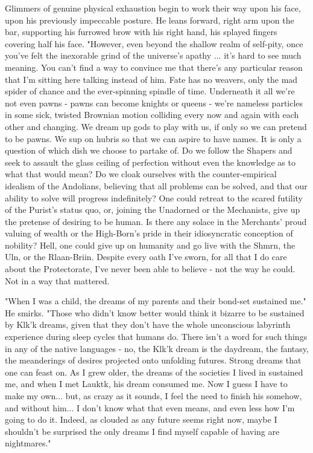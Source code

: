 Glimmers of genuine physical exhaustion begin to work their way upon
his face, upon his previously impeccable posture. He leans forward,
right arm upon the bar, supporting his furrowed brow with his right
hand, his splayed fingers covering half his face. "However, even
beyond the shallow realm of self-pity, once you've felt the inexorable
grind of the universe's apathy ... it's hard to see much meaning.  You
can't find a way to convince me that there's any particular reason
that I'm sitting here talking instead of him. Fate has no weavers,
only the mad spider of chance and the ever-spinning spindle of time.
Underneath it all we're not even pawns - pawns can become knights or
queens - we're nameless particles in some sick, twisted Brownian
motion colliding every now and again with each other and changing.  We
dream up gods to play with us, if only so we can pretend to be
pawns. We sup on hubris so that we can aspire to have names.  It is
only a question of which dish we choose to partake of. Do we follow
the Shapers and seek to assault the glass ceiling of perfection
without even the knowledge as to what that would mean?  Do we cloak
ourselves with the counter-empirical idealism of the Andolians,
believing that all problems can be solved, and that our ability to
solve will progress indefinitely?  One could retreat to the scared
futility of the Purist's status quo, or, joining the Unadorned or the
Mechanists, give up the pretense of desiring to be human.  Is there
any solace in the Merchants' proud valuing of wealth or the
High-Born's pride in their idiosyncratic conception of nobility? Hell,
one could give up on humanity and go live with the Shmrn, the Uln, or
the Rlaan-Briin. Despite every oath I've sworn, for all that I do care
about the Protectorate, I've never been able to believe - not the way
he could. Not in a way that mattered.

"When I was a child, the dreams of my parents and their bond-set
sustained me."  He smirks. "Those who didn't know better would think
it bizarre to be sustained by Klk'k dreams, given that they don't have
the whole unconscious labyrinth experience during sleep cycles that
humans do.  There isn't a word for such things in any of the native
languages - no, the Klk'k dream is the daydream, the fantasy, the
meanderings of desires projected onto unfolding futures. Strong dreams
that one can feast on.  As I grew older, the dreams of the societies I
lived in sustained me, and when I met Lauktk, his dream consumed
me. Now I guess I have to make my own... but, as crazy as it sounds, I
feel the need to finish his somehow, and without him... I don't know
what that even means, and even less how I'm going to do it. Indeed, as
clouded as any future seems right now, maybe I shouldn't be surprised
the only dreams I find myself capable of having are nightmares."

